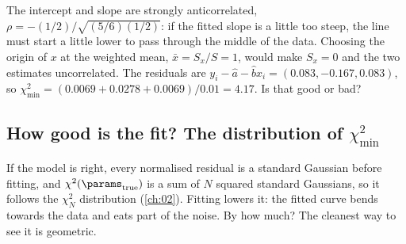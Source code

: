 The intercept and slope are strongly anticorrelated, $\rho=-(1/2)/\sqrt{(5/6)(1/2)}$:
if the fitted slope is a little too steep, the line must start a little
lower to pass through the middle of the data. Choosing the origin of $x$
at the weighted mean, $\bar x=S_x/S=1$, would make $S_x=0$ and the two
estimates uncorrelated. The residuals are $y_i-\hat a-\hat bx_i=(0.083,-0.167,0.083)$,
so $\chi^2_{\min}=(0.0069+0.0278+0.0069)/0.01=4.17$. Is that good or bad?

\subsection{How good is the fit? The distribution of \texorpdfstring{$\chi^2_{\min}$}{chi2min}}
\label{3b:sec:chi2-min}

If the model is right, every normalised residual is a standard Gaussian
before fitting, and $\chi^2(\params_{\text{true}})$ is a sum of $N$ squared
standard Gaussians, so it follows the $\chi^2_N$ distribution (\cref{ch:02}).
Fitting lowers it: the fitted curve bends towards the data and eats part
of the noise. By how much? The cleanest way to see it is geometric.

